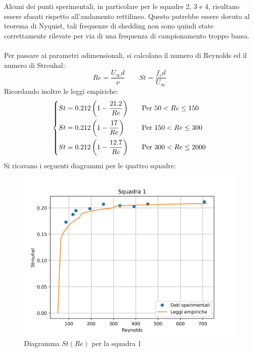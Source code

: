 \noindent Alcuni dei punti sperimentali, in particolare per le squadre 2, 3 e 4, risultano essere sfasati rispetto all'andamento rettilineo. Questo potrebbe essere dovuto al teorema di Nyquist, tali frequenze di shedding non sono quindi state correttamente rilevate per via di una frequenza di campionamento troppo bassa.\\\\
Per passare ai parametri adimensionali, si calcolano il numero di Reynolds ed il numero di Strouhal:
\begin{equation*}
    Re = \frac{U_\infty d}{\nu} \qquad St = \frac{f_s d}{U_\infty}
\end{equation*}
Ricordando inoltre le leggi empiriche:
\begin{equation*}
    \begin{dcases}
        St = 0.212\left(1-\frac{21.2}{Re}\right) \quad &\text{Per } 50<Re\le150\\
        St = 0.212\left(1-\frac{17}{Re}\right) \quad &\text{Per } 150<Re\le300\\
        St = 0.212\left(1-\frac{12.7}{Re}\right) \quad &\text{Per } 300<Re\le2000
    \end{dcases}
\end{equation*}
Si ricavano i seguenti diagrammi per le quattro squadre:
\begin{figure}[H]
    \centering
    \includegraphics[width=.85\textwidth]{images/10/sq1adim.png}
    \caption{Diagramma $St(Re)$ per la squadra 1}
\end{figure}
